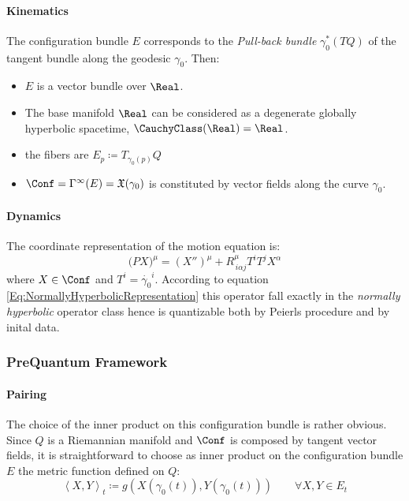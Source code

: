 \documentclass[Main]{subfiles}
\begin{document}
			\paragraph{Kinematics}	
			The configuration bundle $E$ corresponds to the \emph{Pull-back bundle} $\gamma_0^*(TQ)$ of the tangent bundle along the geodesic $\gamma_0$.
			Then:
			\begin{itemize}
				\item $E$ is a vector bundle over $\Real$.
				\item The base manifold $\Real$ can be considered as a degenerate globally hyperbolic spacetime, $\CauchyClass(\Real) = \Real$.
				\item the fibers are $E_p \coloneqq T_{\gamma_0(p)}Q$
				\item $\Conf = \Gamma^\infty(E) = \mathfrak{X}(\gamma_0)$ is constituted by vector fields along the curve $\gamma_0$.
			\end{itemize}
			
			\paragraph{Dynamics}
				The coordinate representation of the motion equation is:
				\begin{displaymath}
					\big( P X)^\mu = (X'')^\mu + R^\mu_{\, i \alpha j } T^i T^j X^\alpha
				\end{displaymath}
				where $X\in \Conf$ and $T^i = \dot{\gamma_0}^i$.
				According to equation \ref{Eq:NormallyHyperbolicRepresentation} this operator fall exactly in the \emph{normally hyperbolic} operator class hence is quantizable both by Peierls procedure and by inital data.
				
		\subsubsection{PreQuantum Framework}
			\paragraph{Pairing}
				The choice of the inner product on this configuration bundle is rather obvious.
				Since $Q$ is a Riemannian manifold and $\Conf$ is composed by tangent vector fields, it is straightforward to choose as inner product on the configuration bundle $E$ the metric function defined on $Q$:
				\begin{equation}
					\left\langle X,Y \right\rangle_t \coloneqq g\left( X\left(\gamma_0(t) \right),Y\left(\gamma_0(t) \right)\right)
					\qquad \forall X,Y \in E_t
				\end{equation}
				
\end{document}
